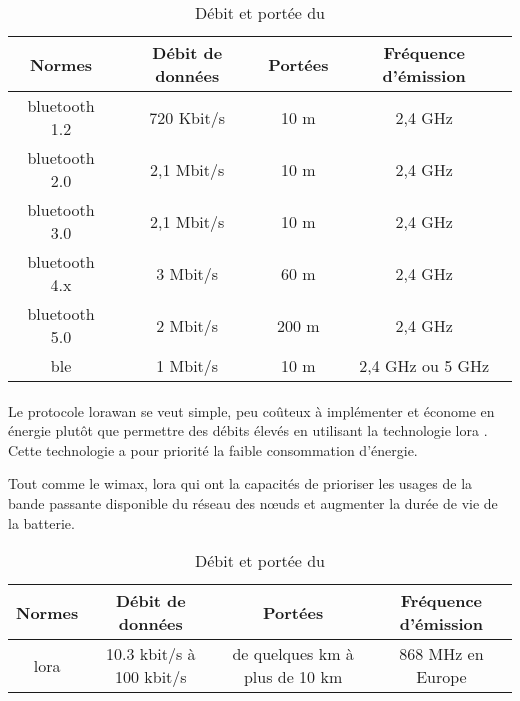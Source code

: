 \begin{table}[H]
    \centering
    \begin{tabular}{|c|c|c|c|}
        \hline
        \rowcolor{tableColorDark} Normes & Débit de données & Portées & Fréquence d'émission \\
        \hline

        \gls{bluetooth} 1.2              & 720 Kbit/s       & 10 m    & 2,4 GHz              \\\hline
        \gls{bluetooth} 2.0              & 2,1 Mbit/s       & 10 m    & 2,4 GHz              \\\hline
        \gls{bluetooth} 3.0              & 2,1 Mbit/s       & 10 m    & 2,4 GHz              \\\hline
        \gls{bluetooth} 4.x              & 3 Mbit/s         & 60 m    & 2,4 GHz              \\\hline
        \gls{bluetooth} 5.0              & 2 Mbit/s         & 200 m   & 2,4 GHz              \\\hline
        \gls{ble}                        & 1 Mbit/s         & 10 m    & 2,4 GHz ou 5 GHz     \\\hline
    \end{tabular}
    \label{tab:debitPorteeBluetooth}
    \caption{Débit et portée du }
    \nocite{ble}\nocite{debitPortee}
\end{table}

\paragraph{}
\label{sec:lorawan}

Le protocole \gls{lorawan} se veut simple, peu coûteux à implémenter et économe en énergie plutôt que permettre des débits élevés en
utilisant la technologie \gls{lora} \cite{lorawan}. Cette technologie a pour priorité la faible consommation d'énergie.\newline

Tout comme le \gls{wimax}, \gls{lora} qui ont la capacités de prioriser les usages de la bande passante disponible du
réseau des nœuds et augmenter la durée de vie de la batterie.

\begin{table}[H]
    \centering
    \begin{tabular}{|c|c|c|c|}
        \hline
        \rowcolor{tableColorDark} Normes & Débit de données         & Portées                        & Fréquence d'émission \\
        \hline

        \gls{lora}                       & 10.3 kbit/s à 100 kbit/s & de quelques km à plus de 10 km & 868 MHz en Europe    \\\hline
    \end{tabular}
    \label{tab:debitPorteeLora}
    \caption{Débit et portée du }
    \nocite{debitPortee}
\end{table}

